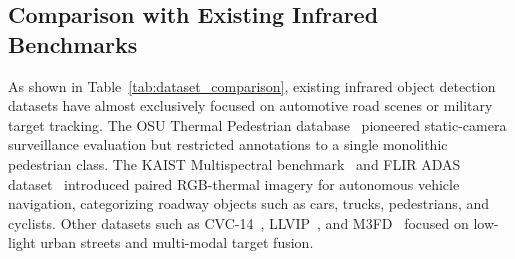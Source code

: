 \documentclass[journal,twoside,web]{ieeecolor}
\begin{document}
\subsection{Comparison with Existing Infrared Benchmarks}
As shown in Table~\ref{tab:dataset_comparison}, existing infrared object detection datasets have almost exclusively focused on automotive road scenes or military target tracking. The OSU Thermal Pedestrian database~\cite{davis2007background} pioneered static-camera surveillance evaluation but restricted annotations to a single monolithic pedestrian class. The KAIST Multispectral benchmark~\cite{choi2018kaist} and FLIR ADAS dataset~\cite{flir_adas_dataset} introduced paired RGB-thermal imagery for autonomous vehicle navigation, categorizing roadway objects such as cars, trucks, pedestrians, and cyclists. Other datasets such as CVC-14~\cite{gonzalez2016pedestrian}, LLVIP~\cite{jia2021llvip}, and M3FD~\cite{liu2022target} focused on low-light urban streets and multi-modal target fusion.
\end{document}
